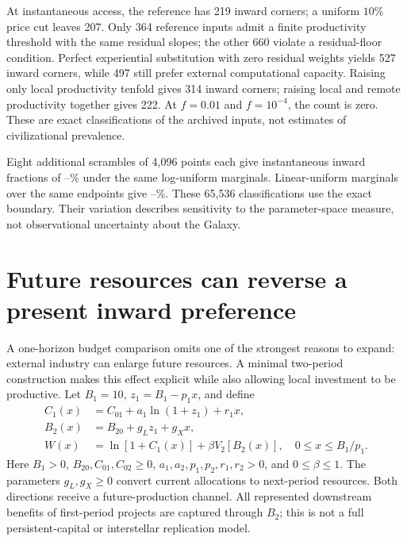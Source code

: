 At instantaneous access, the reference has 219 inward corners; a
uniform $10\%$ price cut leaves 207. Only 364 reference inputs admit
a finite productivity threshold with the same residual slopes; the other
660 violate a residual-floor condition. Perfect experiential substitution
with zero residual weights yields 527 inward corners, while 497 still
prefer external computational capacity. Raising only local productivity
tenfold gives 314 inward corners; raising local and remote productivity
together gives 222. At $f=0.01$ and $f=10^{-4}$, the count is zero.
These are exact classifications of the archived inputs, not estimates of
civilizational prevalence.

Eight additional scrambles of 4,096 points each give instantaneous
inward fractions of \DesignLogMin--\DesignLogMax\% under the same
log-uniform marginals. Linear-uniform marginals over the same endpoints
give \DesignLinearMin--\DesignLinearMax\%. These 65,536 classifications
use the exact boundary. Their variation describes sensitivity to the
parameter-space measure, not observational uncertainty about the Galaxy.

\section{Future resources can reverse a present inward preference}
\label{sec:dynamic}

A one-horizon budget comparison omits one of the strongest reasons to expand: external industry can enlarge future resources. A minimal two-period construction makes this effect explicit while also allowing local investment to be productive. Let $B_1=10$, $z_1=B_1-p_1x$, and define
\begin{align}
 C_1(x)&=C_{01}+a_1\ln(1+z_1)+r_1x,\nonumber\\
 B_2(x)&=B_{20}+g_Lz_1+g_Xx,\label{eq:futurebudget}\\
 W(x)&=\ln[1+C_1(x)]+\beta V_2[B_2(x)],\quad 0\leq x\leq B_1/p_1.
 \label{eq:dynamic}
\end{align}
Here $B_1>0$, $B_{20},C_{01},C_{02}\geq0$, $a_1,a_2,p_1,p_2,r_1,r_2>0$, and $0\leq\beta\leq1$. The parameters $g_L,g_X\geq0$ convert current allocations to next-period resources. Both directions receive a future-production channel. All represented downstream benefits of first-period projects are captured through $B_2$; this is not a full persistent-capital or interstellar replication model.

